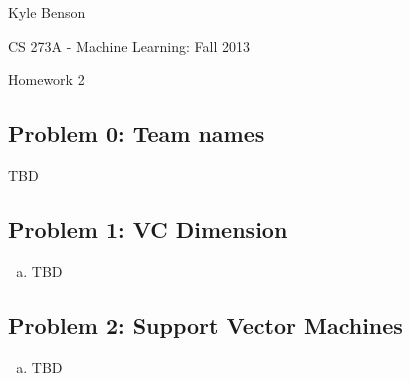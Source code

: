 \documentclass[twoside,11pt]{article}
\newcommand{\figdir}{figs}
\theoremstyle{definition}
\begin{document}
\centerline{\Large Kyle Benson}
\centerline{CS 273A - Machine Learning: Fall 2013}
\centerline{Homework 2}

\subsection*{Problem 0: Team names}

TBD

\subsection*{Problem 1: VC Dimension}

\begin{enumerate}[(a)]

\item TBD

\end{enumerate}


\subsection*{Problem 2: Support Vector Machines}

\begin{enumerate}[(a)]
\item TBD
\end{enumerate}
\end{document}
